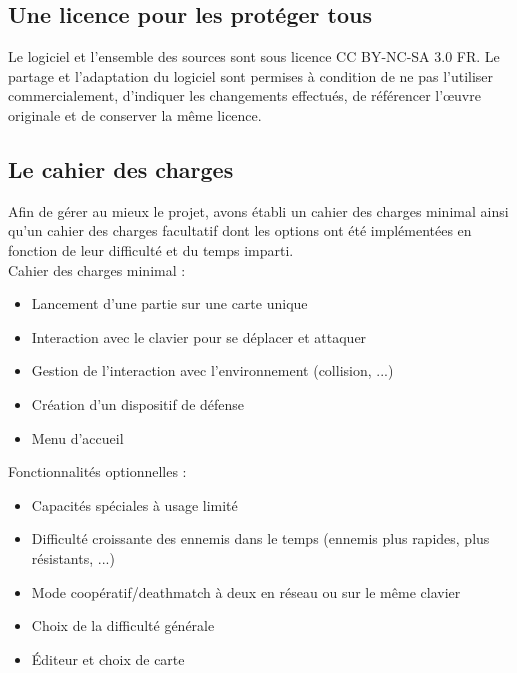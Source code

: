 \subsection{Une licence pour les protéger tous}

Le logiciel et l'ensemble des sources sont sous licence CC BY-NC-SA 3.0 FR. Le partage et l'adaptation du logiciel sont permises à condition de ne pas l'utiliser
commercialement, d'indiquer les changements effectués, de référencer l’œuvre originale et 
de conserver la même licence.

\subsection{Le cahier des charges}

Afin de gérer au mieux le projet, avons établi un cahier des charges minimal ainsi qu'un cahier des charges facultatif dont les options ont été implémentées en fonction de leur difficulté et du temps imparti. \\
Cahier des charges minimal :
\begin{itemize}
\item Lancement d’une partie sur une carte unique
\item Interaction avec le clavier pour se déplacer et attaquer
\item Gestion de l’interaction avec l’environnement (collision, ...)
\item Création d’un dispositif de défense
\item Menu d’accueil
\end{itemize}
Fonctionnalités optionnelles :
\begin{itemize}
\item Capacités spéciales à usage limité
\item Difficulté croissante des ennemis dans le temps (ennemis plus rapides, plus résistants, ...)
\item Mode coopératif/deathmatch à deux en réseau ou sur le même clavier
\item Choix de la difficulté générale
\item Éditeur et choix de carte
\end{itemize}